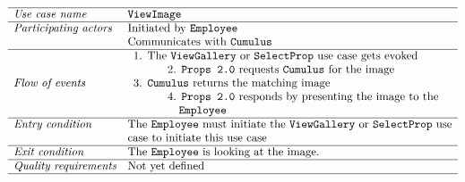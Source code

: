 \documentclass[12pt]{article}
\begin{document}
\[
\begin{array}{ll}
\hline
\textit{Use case name} & \texttt{ViewImage} \\
\hline
\textit{Participating actors} & \text{Initiated by \texttt{Employee}}\\ &
\text{Communicates with \texttt{Cumulus}}\\
\hline
\textit{Flow of events} & 
\begin{array}{l}
\text{1. The \texttt{ViewGallery} or \texttt{SelectProp} use case gets evoked}\\
\quad \quad \quad \text{2. \texttt{Props 2.0} requests \texttt{Cumulus} for the image}\\
\text{3. \texttt{Cumulus} returns the matching image}\\
\quad \quad \quad \text{4. \texttt{Props 2.0} responds by presenting the image to the}\\ \quad \quad \quad \quad\texttt{Employee}
\end{array} \\
\hline
\textit{Entry condition} &
\text{The \texttt{Employee} must initiate the \texttt{ViewGallery} or \texttt{SelectProp} use}\\ &
\text{case to initiate this use case}\\
\hline
\textit{Exit condition} & \text{The \texttt{Employee} is looking at the image.} \\
\hline
\textit{Quality requirements} & \text{Not yet defined} \\
\hline
\end{array}
\]
\end{document}

